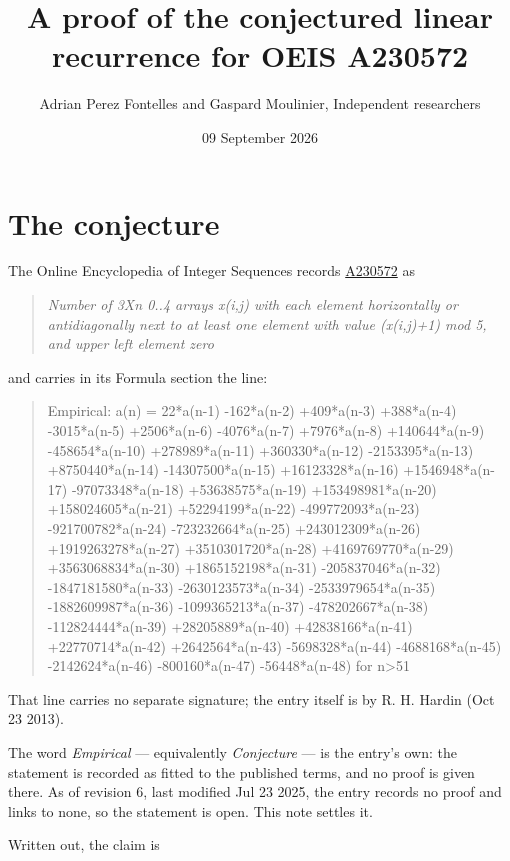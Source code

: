 \documentclass[11pt]{article}
\title{A proof of the conjectured linear recurrence for OEIS A230572}
\author{Adrian Perez Fontelles and Gaspard Moulinier, Independent researchers}
\date{09 September 2026}
\theoremstyle{definition}
\begin{document}
\maketitle
\section{The conjecture}

The Online Encyclopedia of Integer Sequences records \href{https://oeis.org/A230572}{A230572} as

\begin{quote}\itshape Number of 3Xn 0..4 arrays x(i,j) with each element horizontally or antidiagonally next to at least one element with value (x(i,j)+1) mod 5, and upper left element zero\end{quote}

and carries in its Formula section the line:

\begin{quote}\ttfamily Empirical: a(n) = 22*a(n-1) -162*a(n-2) +409*a(n-3) +388*a(n-4) -3015*a(n-5) +2506*a(n-6) -4076*a(n-7) +7976*a(n-8) +140644*a(n-9) -458654*a(n-10) +278989*a(n-11) +360330*a(n-12) -2153395*a(n-13) +8750440*a(n-14) -14307500*a(n-15) +16123328*a(n-16) +1546948*a(n-17) -97073348*a(n-18) +53638575*a(n-19) +153498981*a(n-20) +158024605*a(n-21) +52294199*a(n-22) -499772093*a(n-23) -921700782*a(n-24) -723232664*a(n-25) +243012309*a(n-26) +1919263278*a(n-27) +3510301720*a(n-28) +4169769770*a(n-29) +3563068834*a(n-30) +1865152198*a(n-31) -205837046*a(n-32) -1847181580*a(n-33) -2630123573*a(n-34) -2533979654*a(n-35) -1882609987*a(n-36) -1099365213*a(n-37) -478202667*a(n-38) -112824444*a(n-39) +28205889*a(n-40) +42838166*a(n-41) +22770714*a(n-42) +2642564*a(n-43) -5698328*a(n-44) -4688168*a(n-45) -2142624*a(n-46) -800160*a(n-47) -56448*a(n-48) for n>51\end{quote}

That line carries no separate signature; the entry itself is by R. H. Hardin (Oct 23 2013).

The word {\itshape Empirical} --- equivalently {\itshape Conjecture} --- is the entry's own: the statement is recorded as fitted to the published terms, and no proof is given there. As of revision 6, last modified Jul 23 2025, the entry records no proof and links to none, so the statement is open. This note settles it.

Written out, the claim is
\end{document}
